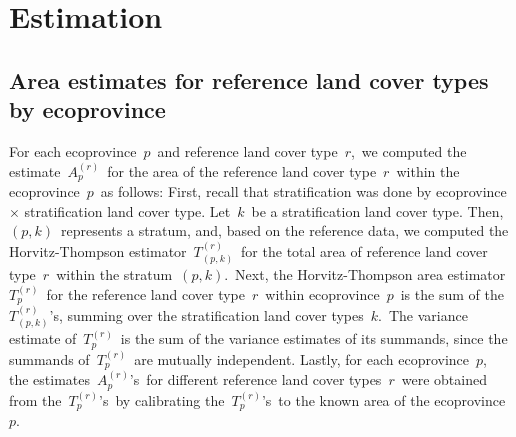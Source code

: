 

\section{Estimation}


\subsection{Area estimates for reference land cover types by ecoprovince}
For each ecoprovince \,$p$\, and reference land cover type \,$r$,\,
we computed the estimate \,$A_{p}^{(r)}$\,
for the area of the reference land cover type \,$r$\, within the ecoprovince \,$p$\, as follows:
First, recall that stratification was done by ecoprovince $\times$ stratification land cover 
type. Let \,$k$\, be a stratification land cover type.
Then, \,$(p,k)$\, represents a stratum, and, based 
on the reference data, we computed the Horvitz-Thompson estimator
\,$T^{(r)}_{(p,k)}$\, for the total area of reference land cover type \,$r$\,
within the stratum \,$(p,k)$.\,
Next, the Horvitz-Thompson area estimator \,$T_{p}^{(r)}$\,
for the reference land cover type \,$r$\, within ecoprovince \,$p$\, is the sum of 
the \,$T^{(r)}_{(p,k)}$’s, summing over the stratification land cover types \,$k$.\,
The variance estimate of \,$T^{(r)}_{p}$\,
is the sum of the variance estimates of its summands,
since the summands of
\,$T^{(r)}_{p}$\,
are mutually independent.
Lastly, for each ecoprovince \,$p$,\, the estimates
\,$A_{p}^{(r)}$’s\,
for different reference land cover types \,$r$\, were obtained from the
\,$T_{p}^{(r)}$'s\,
by {\color{black}calibrating} the
\,$T_{p}^{(r)}$’s\,
to the known area of the ecoprovince \,$p$.\, 


